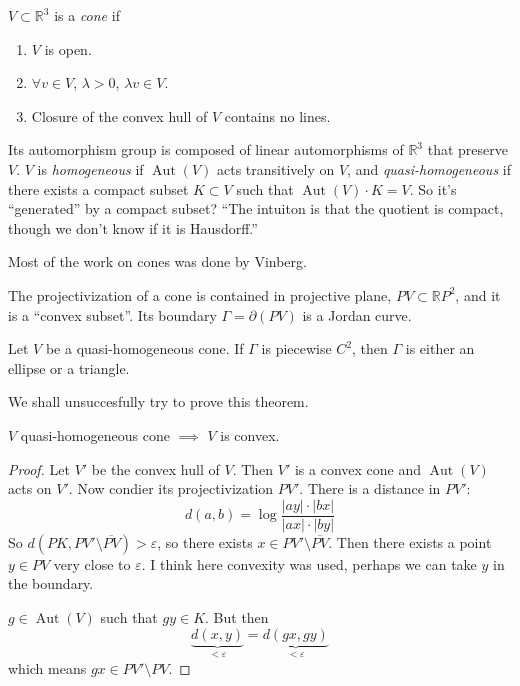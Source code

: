 \begin{definition}
\label{definition-frolov-cone}
$V\subset \mathbb{R}^{3}$ is a \textit{cone}
if
\begin{enumerate}
\item $V$ is open.
\item $\forall v\in V$, $\lambda>0$, $\lambda
v \in V$.
\item Closure of the convex hull of $V$
contains no lines.
\end{enumerate}
Its automorphism group is composed of linear
automorphisms of $\mathbb{R}^{3}$ that
preserve $V$. $V$ is \textit{homogeneous} if
$\operatorname{Aut}(V)$ acts transitively on
$V$, and \textit{quasi-homogeneous} if there
exists a compact subset $K\subset V$ such
that $\operatorname{Aut}(V)\cdot K=V$. So
it's ``generated'' by a compact subset? ``The
intuiton is that the quotient is compact,
though we don't know if it is Hausdorff.''
\end{definition}

\begin{remark}[Misha]
\label{remark-frolov-misha-vinberg}
Most of the work on cones was done by
Vinberg.
\end{remark}

The projectivization of a cone is contained
in projective plane, $PV\subset
\mathbb{R}P^{2}$, and it is a ``convex
subset''. Its boundary $\Gamma=\partial(PV)$
is a Jordan curve.

\begin{theorem}
\label{theorem-frolov-kac-vinberg}
Let $V$ be a quasi-homogeneous cone. If
$\Gamma$ is piecewise $C^2$, then $\Gamma$ is
either an ellipse or a triangle.
\end{theorem}

We shall unsuccesfully try to prove this
theorem.

\begin{lemma}
\label{lemma-frolov-convex}
$V$ quasi-homogeneous cone $\implies $ $V$ is
convex.
\end{lemma}

\begin{proof}
Let $V'$ be the convex hull of $V$. Then $V'$
is a convex cone and $\operatorname{Aut}(V)$
acts on $V'$. Now condier its
projectivization $PV'$. There is a distance
in $PV'$:
$$d(a,b)=\operatorname{log}\frac{|ay|\cdot
|bx|}{|ax|\cdot |by|}$$
So $d(PK,PV'\setminus
\overline{PV})>\varepsilon$, so there exists
$x \in PV'\setminus \overline{PV}$. Then
there exists a point $y \in PV$ very close to
$\varepsilon$. I think here convexity was
used, perhaps we can take $y $ in the
boundary.

$g\in\operatorname{Aut}(V)$ such that $gy \in
K$. But then
$$\underbrace{d(x,y)}_{<\varepsilon}=
\underbrace{d(gx,gy)}_{<\varepsilon}$$
which means $gx\in PV'\setminus PV$.
\end{proof}

